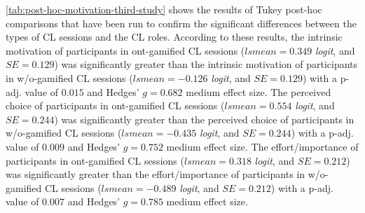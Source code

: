 {} 


\autoref{tab:post-hoc-motivation-third-study} shows the results of Tukey post-hoc comparisons that have been run to confirm the significant differences between the types of CL sessions and the CL roles. According to these results, the intrinsic motivation of participants in ont-gamified CL sessions ($lsmean=0.349$ \emph{logit}, and $SE = 0.129$) was significantly greater than the intrinsic motivation of participants in w/o-gamified CL sessions ($lsmean=-0.126$ \emph{logit}, and $SE = 0.129$) with a p-adj. value of $0.015$ and Hedges' $g=0.682$ medium effect size.
The perceived choice of participants in ont-gamified CL sessions ($lsmean=0.554$ \emph{logit}, and $SE = 0.244$) was significantly greater than the perceived choice of participants in w/o-gamified CL sessions ($lsmean=-0.435$ \emph{logit}, and $SE = 0.244$) with a p-adj. value of $0.009$ and Hedges' $g=0.752$ medium effect size.
The effort/importance of participants in ont-gamified CL sessions ($lsmean=0.318$ \emph{logit}, and $SE = 0.212$) was significantly greater than the effort/importance of participants in w/o-gamified CL sessions ($lsmean=-0.489$ \emph{logit}, and $SE = 0.212$) with a p-adj. value of $0.007$ and Hedges' $g=0.785$ medium effect size.

